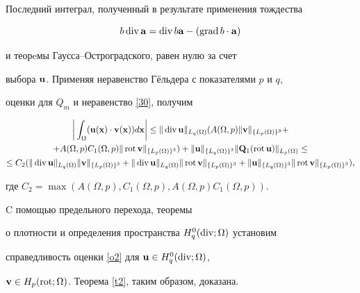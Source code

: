 Последний интеграл, полученный в результате применения тождества


$$


b\Div\bold{a}=\Div b\bold{a}-(\Grad b\cdot\bold{a})


$$


и теорeмы Гаусса--Остроградского, равен нулю за счет


выбора $\bold{u}$. Применяя неравенство Г\"ель\-де\-ра с показателями $p$ и $q$,


оценки для $Q_m$ и неравенство \ref{30}, получим


\begin{gather*}


\bigg|\int_{\Omega}(\bold{u}(\bold{x})\cdot\bold{v}(\bold{x}))d\bold{x}\bigg|\leq


\|\Div\bold{u}\|_{L_q(\Omega)}(A(\Omega,p)\|\bold{v}\|_


{\{L_p(\Omega)\}^3}+ \\


%


+A(\Omega,p)C_1(\Omega,p)


\|\Rot\bold{v}\|_{\{L_p(\Omega)\}^3})+


\|\bold{u}\|_{\{L_q(\Omega)\}^3}\|\bold{Q}_1(\Rot\bold{u})\|_


{L_p(\Omega)}\leq \\


%


\leq C_2(\|\Div\bold{u}\|_{L_q(\Omega)}\|\bold{v}\|_


{\{L_p(\Omega)\}^3}+\|\Div\bold{u}\|_{L_q(\Omega)}\|\Rot\bold{v}\|_


{\{L_p(\Omega)\}^3}+


\|\bold{u}\|_{\{L_q(\Omega)\}^3}\|\Rot\bold{v}\|_


{\{L_p(\Omega)\}^3}),


\end{gather*}


где $C_2=\max(A(\Omega,p),C_1(\Omega,p),A(\Omega,p)C_1(\Omega,p))$.





C помощью предельного перехода, теоремы


о плотности и определения пространства $H_q^0(\operatorname{div};\Omega)$ установим


справедливость оценки \eqref{o2} для $\bold{u}\in H_q^0(\operatorname{div};\Omega)$,


${\bold{v}\in H_p(\operatorname{rot};\Omega)}$. Теорема \ref{t2}, таким образом, доказана.





